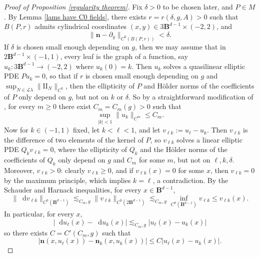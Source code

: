 \documentclass[reqno,11pt]{amsart}
\newcommand{\Ball}{\mathbf{B}}
\newcommand*\dif{\mathop{}\!\mathrm{d}}
\newcommand{\Leaves}{\mathscr L}
\newcommand{\Two}{\mathrm{I\!I}}
\newcommand{\normal}{\mathbf n}
\theoremstyle{definition}
\numberwithin{equation}{section}
\begin{document}
\begin{proof}[Proof of Proposition \ref{regularity theorem}]
Fix $\delta > 0$ to be chosen later, and $P \in M$.
By Lemma \ref{lams have C0 fields}, there exists $r = r(\delta, g, A) > 0$ such that $B(P, r)$ admits cylindrical coordinates $(x, y) \in 3\Ball^{d - 1} \times (-2, 2)$, and
\begin{equation}\label{normal is almost constant}
\|\normal - \partial_y\|_{C^0(B(P, r))} < \delta.
\end{equation}
If $\delta$ is chosen small enough depending on $g$, then we may assume that in $2\Ball^{d - 1} \times (-1, 1)$,
every leaf is the graph of a function, say $u_k: 3\Ball^{d - 1} \to (-2, 2)$ where $u_k(0) = k$.
Then $u_k$ solves a quasilinear elliptic PDE $Pu_k = 0$, so that if $r$ is chosen small enough depending on $g$ and $\sup_{N \in \Leaves \lambda} \|\Two_N\|_{C^0}$, then the ellipticity of $P$ and H\"older norms of the coefficients of $P$ only depend on $g$, but not on $k$ or $\delta$.
So by a straightforward modification of \cite[Corollary 16.7]{gilbarg2015elliptic}, for every $m \geq 0$ there exist $C_m = C_m(g) > 0$ such that
\begin{equation}\label{norms on uk}
\sup_{|k| < 1} \|u_k\|_{C^m} \leq C_m.
\end{equation}
Now for $k \in (-1, 1)$ fixed, let $k < \ell < 1$, and let $v_{\ell k} := u_\ell - u_k$.
Then $v_{\ell k}$ is the difference of two elements of the kernel of $P$, so $v_{\ell k}$ solves a linear elliptic PDE $Q_k v_{\ell k} = 0$, where the ellipticity of $Q_k$ and the H\"older norms of the coefficients of $Q_k$ only depend on $g$ and $C_m$ for some $m$, but not on $\ell, k, \delta$.
Moreover, $v_{\ell k} > 0$: clearly $v_{\ell k} \geq 0$, and if $v_{\ell k}(x) = 0$ for some $x$, then $v_{\ell k} = 0$ by the maximum principle, which implies $k = \ell$, a contradiction.
By the Schauder \cite[Theorem 6.2]{gilbarg2015elliptic} and Harnack \cite[Theorem 9.25]{gilbarg2015elliptic} inequalities, for every $x \in \Ball^{d - 1}$,
\begin{equation}\label{Schauder Harnack}
	\|\dif v_{\ell k}\|_{C^0(\Ball^{d - 1})} \lesssim_{C_m, g} \|v_{\ell k}\|_{C^0(2 \Ball^{d - 1})} \lesssim_{C_m, g} \inf_{C^0(\Ball^{d - 1})} v_{\ell k} \leq v_{\ell k}(x).
\end{equation}
In particular, for every $x$,
$$|\dif u_\ell(x) - \dif u_k(x)| \lesssim_{C_m, g} |u_\ell(x) - u_k(x)|$$
so there exists $C = C'(C_m, g)$ such that
\begin{equation}\label{vertical Lipschitz}
|\normal(x, u_\ell(x)) - \normal_k(x, u_k(x))| \leq C |u_\ell(x) - u_k(x)|.
\end{equation}


\end{proof}
\end{document}
